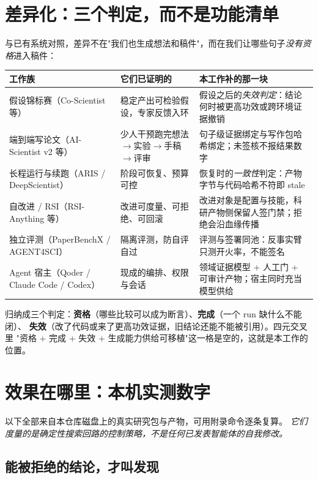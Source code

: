 \documentclass[11pt,a4paper]{ctexart}
\begin{document}
\section{差异化：三个判定，而不是功能清单}

与已有系统对照，差异不在"我们也生成想法和稿件"，而在我们让哪些句子\emph{没有资格}进入稿件：

\begin{longtable}{p{3.3cm}p{5.2cm}p{5.9cm}}
\toprule
\textbf{工作族} & \textbf{它们已证明的} & \textbf{本工作补的那一块} \\
\midrule
\endhead
假设锦标赛（Co-Scientist 等） & 稳定产出可检验假设，专家反馈入环 & 假设之后的\emph{失效判定}：结论何时被更高功效或跨环境证据撤销 \\
\addlinespace
端到端写论文（AI-Scientist v2 等） & 少人干预跑完想法$\to$实验$\to$手稿$\to$评审 & 句子级证据绑定与写作包哈希绑定；未签核不报结果数字 \\
\addlinespace
长程运行与续跑（ARIS / DeepScientist） & 阶段可恢复、预算可控 & 恢复时的\emph{一致性}判定：产物字节与代码哈希不符即 stale \\
\addlinespace
自改进 / RSI（RSI-Anything 等） & 改进可度量、可拒绝、可回滚 & 改进对象是配置与技能，科研产物侧保留人签门禁；拒绝会沿血缘传播 \\
\addlinespace
独立评测（PaperBenchX / AGENT4SCI） & 隔离评测，防自评自过 & 评测与签署同池：反事实臂只测开火率，不能签名 \\
\addlinespace
Agent 宿主（Qoder / Claude Code / Codex） & 现成的编排、权限与会话 & 领域证据模型 + 人工门 + 可审计产物；宿主同时充当模型供给 \\
\bottomrule
\end{longtable}

归纳成三个判定：\textbf{资格}（哪些比较可以成为断言）、\textbf{完成}（一个 run 缺什么不能闭）、
\textbf{失效}（改了代码或来了更高功效证据，旧结论还能不能被引用）。四元交叉里
"资格 + 完成 + 失效 + 生成能力供给可移植"这一格是空的，这就是本工作的位置。

\section{效果在哪里：本机实测数字}

以下全部来自本仓库磁盘上的真实研究包与产物，可用附录命令逐条复算。
\emph{它们度量的是确定性搜索回路的控制策略，不是任何已发表智能体的自我修改。}

\subsection{能被拒绝的结论，才叫发现}
\end{document}
